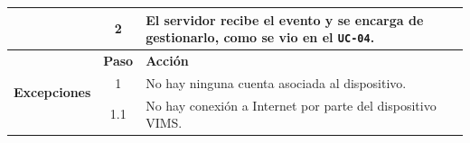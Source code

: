 \begin{table}[H]
\begin{tabularx}{\textwidth}{|c|c|X|}
    \cline{2-3}
                                               & 2                                                                                                                                                 & \multicolumn{1}{L|}{El servidor recibe el evento y se encarga de gestionarlo, como se vio en el \texttt{UC-04}.} \\
    \hline
    \multirow{3}{*}{\textbf{Excepciones}}     & \textbf{Paso}                                                                                                                                     & \textbf{Acción}                                                                                                                                                         \\
    \cline{2-3}
                                               & 1                                                                                                                                               & \multicolumn{1}{L|}{No hay ninguna cuenta asociada al dispositivo.}                                                                                                                    \\
    \cline{2-3}
                                               & 1.1                                                                                                                                               & \multicolumn{1}{L|}{No hay conexión a Internet por parte del dispositivo \ac{VIMS}.}                                                                                    \\
    \hline
  \end{tabularx}
\end{table}